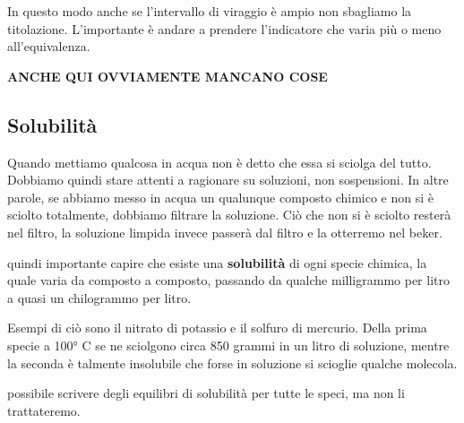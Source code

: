 In questo modo anche se l'intervallo di viraggio è ampio non sbagliamo la titolazione. L'importante è andare a prendere l'indicatore che varia più o meno all'equivalenza.

\textbf{ANCHE QUI OVVIAMENTE MANCANO COSE}
\subsection{Solubilità}
Quando mettiamo qualcosa in acqua non è detto che essa si sciolga del tutto. Dobbiamo quindi stare attenti a ragionare su soluzioni, non sospensioni. In altre parole, se abbiamo messo in acqua un qualunque composto chimico e non si è sciolto totalmente, dobbiamo filtrare la soluzione. Ciò che non si è sciolto resterà nel filtro, la soluzione limpida invece passerà dal filtro e la otterremo nel beker.

\E quindi importante capire che esiste una \textbf{solubilità} di ogni specie chimica, la quale varia da composto a composto, passando da qualche milligrammo per litro a quasi un chilogrammo per litro.

Esempi di ciò sono il nitrato di potassio e il solfuro di mercurio. Della prima specie a 100° C se ne sciolgono circa 850 grammi in un litro di soluzione, mentre la seconda è talmente insolubile che forse in soluzione si scioglie qualche molecola.

\E possibile scrivere degli equilibri di solubilità per tutte le speci, ma non li trattateremo.